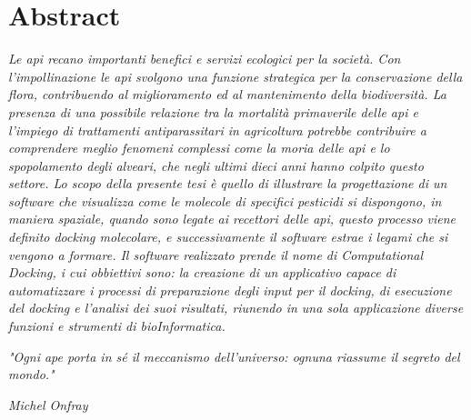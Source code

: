 \chapter*{\centering Abstract}
\begin{adjustwidth}{25pt}{25pt}
\fontsize{18pt}{14 pt}\selectfont
\textit{Le api recano importanti benefici e servizi ecologici per la società. Con l’impollinazione le api svolgono una funzione strategica per la conservazione della flora, contribuendo al miglioramento ed al mantenimento della biodiversità.\newline
La presenza di una possibile relazione tra la mortalità primaverile delle api e l’impiego di trattamenti antiparassitari in agricoltura potrebbe contribuire a comprendere meglio fenomeni complessi come la moria delle api e lo spopolamento degli alveari, che negli ultimi dieci anni hanno colpito questo settore.\newline
Lo scopo della presente tesi è quello di illustrare la progettazione di un software che visualizza come le molecole di specifici pesticidi si dispongono, in maniera spaziale, quando sono legate ai recettori delle api, questo processo viene definito docking molecolare, e successivamente il software estrae i legami che si vengono a formare.\newline
Il software realizzato prende il nome di Computational Docking, i cui obbiettivi sono: la creazione di un applicativo capace di automatizzare i processi di preparazione degli input per il docking, di esecuzione del docking e l'analisi dei suoi risultati, riunendo in una sola applicazione diverse funzioni e strumenti di bioInformatica.\newline}

\emph{"Ogni ape porta in sé il meccanismo dell’universo: ognuna riassume il segreto del mondo."}

\begin{flushright}
    \emph{Michel Onfray}
\end{flushright}

\end{adjustwidth}